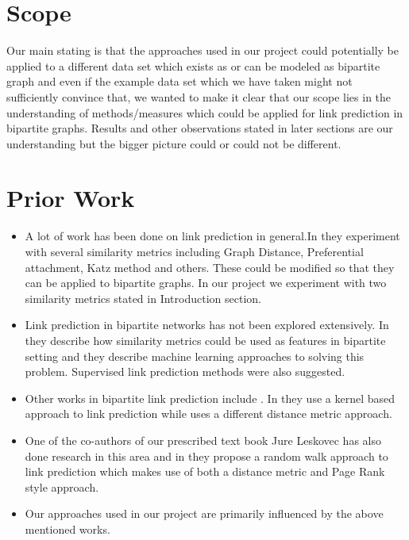 \documentclass[letterpaper,twocolumn,11pt]{article}
\begin{document}
\section{Scope}

Our main stating is that the approaches used in our project could potentially be applied to a different data set which exists as or can be modeled as bipartite graph and even if the example data set which we have taken might not sufficiently convince that, we wanted to make it clear that our scope lies in the understanding of methods/measures which could be applied for link prediction in bipartite graphs. Results and other observations stated in later sections are our understanding but the bigger picture could or could not be different. 

\section{Prior Work}

\begin{itemize}

\item A lot of work has been done on link prediction in general.In \cite{four} they experiment with several similarity metrics including Graph Distance, Preferential attachment, Katz method and others. These could be modified so that they can be applied to bipartite graphs. In our project we experiment with two similarity metrics stated in Introduction section.

\item Link prediction in bipartite networks has not been explored extensively. In \cite{five} they describe how similarity metrics could be used as features in bipartite setting and they describe machine learning approaches to solving this problem. Supervised link prediction methods were also suggested.

\item Other works in bipartite link prediction include \cite{two, three}. In \cite{two} they use a kernel based approach to link prediction while \cite{three} uses a different distance metric approach.

\item One of the co-authors of our prescribed text book Jure Leskovec has also done research in this area and in \cite{one} they propose a random walk approach to link prediction which makes use of both a distance metric and Page Rank style approach.

\item Our approaches used in our project are primarily influenced by the above mentioned works.

\end{itemize}
\end{document}

